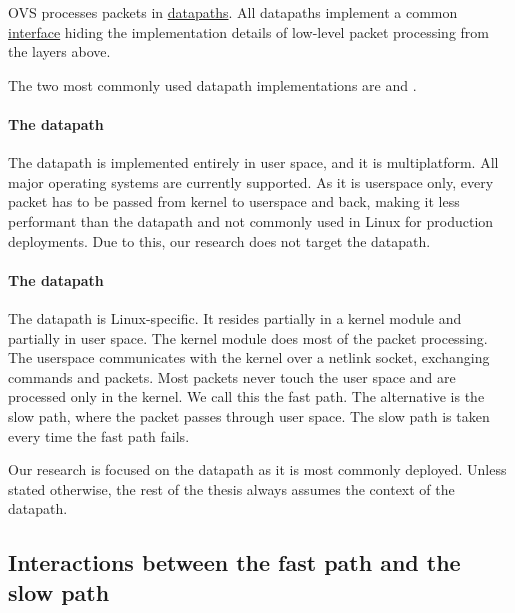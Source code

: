 OVS processes packets in \href{https://github.com/openvswitch/ovs/blob/e90a0727f17f6ad915a32735a8c0b282f2c8cd6f/lib/dpif.h}{datapaths}. All datapaths implement a common \href{https://github.com/openvswitch/ovs/blob/e90a0727f17f6ad915a32735a8c0b282f2c8cd6f/lib/dpif-provider.h\#L107-L117}{interface} hiding the implementation details of low-level packet processing from the layers above.

The two most commonly used datapath implementations are \href{https://github.com/openvswitch/ovs/blob/e90a0727f17f6ad915a32735a8c0b282f2c8cd6f/lib/dpif-netdev.c}{} and \href{https://github.com/openvswitch/ovs/blob/e90a0727f17f6ad915a32735a8c0b282f2c8cd6f/lib/dpif-netlink.c}{}.

\paragraph{The  datapath}
The  datapath is implemented entirely in user space, and it is multiplatform. All major operating systems are currently supported. As it is userspace only, every packet has to be passed from kernel to userspace and back, making it less performant than the  datapath and not commonly used in Linux for production deployments. Due to this, our research does not target the  datapath.

\paragraph{The  datapath}
The  datapath is Linux-specific. It resides partially in a kernel module and partially in user space. The kernel module does most of the packet processing. The userspace communicates with the kernel over a netlink socket, exchanging commands and packets. Most packets never touch the user space and are processed only in the kernel. We call this the fast path. The alternative is the slow path, where the packet passes through user space. The slow path is taken every time the fast path fails.

Our research is focused on the  datapath as it is most commonly deployed. Unless stated otherwise, the rest of the thesis always assumes the context of the  datapath.

\subsection{Interactions between the fast path and the slow path}

